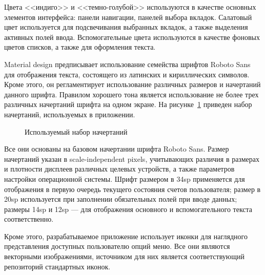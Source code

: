 Цвета <<индиго>> и <<темно-голубой>>
используются в качестве основных элементов интерфейса:
панели навигации, панелей выбора вкладок.
Салатовый цвет используется для подсвечивания выбранных вкладок,
а также выделения активных полей ввода.
Вспомогательные цвета используются в качестве фоновых цветов списков,
а также для оформления текста.

Material design предписывает использование семейства шрифтов
Roboto Sans для отображения текста, состоящего из латинских
и кириллических символов. Кроме этого, он регламентирует
использование различных размеров и начертаний данного шрифта.
Правилом хорошего тона является использование не более трех
различных начертаний шрифта на одном экране.
На рисунке~\ref{fig:design_fonts} приведен набор начертаний,
используемых в приложении.

\begin{figure}[h!]
  \centering
  \caption{Используемый набор начертаний}
  \label{fig:design_fonts}
\end{figure}

Все они основаны на базовом начертании шрифта Roboto Sans.
Размер начертаний указан в scale-independent pixels, учитывающих различия
в размерах и плотности дисплеев различных целевых устройств,
а также параметров настройки операционной системы.
Шрифт размером в 34sp применяется для отображения в первую очередь
текущего состояния счетов пользователя;
размер в 20sp используется при заполнении обязательных полей при вводе данных;
размеры 14sp и 12sp --- для отображения основного и вспомогательного текста
соответственно.

Кроме этого, разрабатываемое приложение использует иконки для
наглядного представления доступных пользователю опций меню.
Все они являются векторными изображениями, источником для них
является соответствующий репозиторий стандартных иконок.